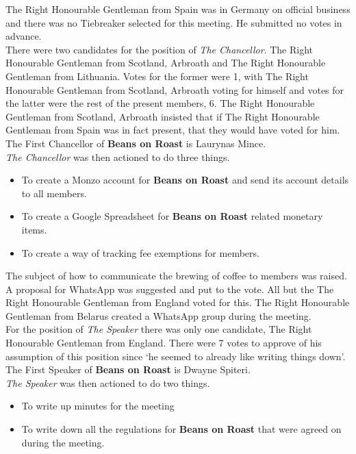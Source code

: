 \documentclass[a4paper,11pt]{article}
\begin{document}
\noindent The Right Honourable Gentleman from Spain was in Germany on official business and there was no Tiebreaker selected for this meeting. He submitted no votes in advance.\\
    
\noindent There were two candidates for the position of \textit{The Chancellor}. The Right Honourable Gentleman from Scotland, Arbroath and The Right Honourable Gentleman from Lithuania. Votes for the former were 1, with The Right Honourable Gentleman from Scotland, Arbroath voting for himself and votes for the latter were the rest of the present members, 6. The Right Honourable Gentleman from Scotland, Arbroath insisted that if The Right Honourable Gentleman from Spain was in fact present, that they would have voted for him. The First Chancellor of \textbf{Beans on Roast} is Laurynas Mince. \\

\noindent \textit{The Chancellor} was then actioned to do three things.
\begin{itemize}
\item To create a Monzo account for \textbf{Beans on Roast} and send its account details to all members.
\item To create a Google Spreadsheet for \textbf{Beans on Roast} related monetary items.
\item To create a way of tracking fee exemptions for members.
\end{itemize}

\noindent The subject of how to communicate the brewing of coffee to members was raised. A proposal for WhatsApp was suggested and put to the vote. All but the The Right Honourable Gentleman from England voted for this. The Right Honourable Gentleman from Belarus created a WhatsApp group during the meeting.\\

\noindent For the position of \textit{The Speaker} there was only one candidate, The Right Honourable Gentleman from England. There were 7 votes to approve of his assumption of this position since `he seemed to already like writing things down'. The First Speaker of \textbf{Beans on Roast} is Dwayne Spiteri. \\
\noindent \textit{The Speaker} was then actioned to do two things.
\begin{itemize}
\item To write up minutes for the meeting
\item To write down all the regulations for \textbf{Beans on Roast} that were agreed on during the meeting.
\end{itemize}
\end{document}

